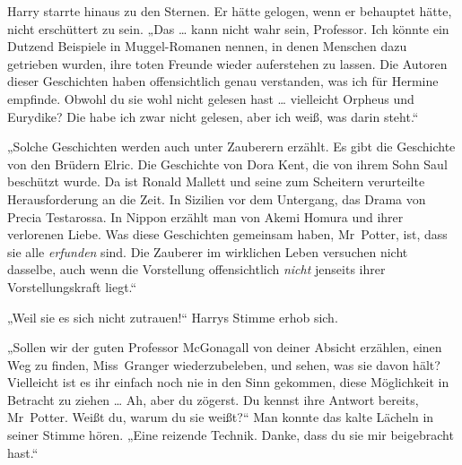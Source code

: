 Harry starrte hinaus zu den Sternen. Er hätte gelogen, wenn er behauptet hätte, nicht erschüttert zu sein.
„Das … kann nicht wahr sein, Professor. Ich könnte ein Dutzend Beispiele in Muggel-Romanen nennen, in denen Menschen dazu getrieben wurden, ihre toten Freunde wieder auferstehen zu lassen. Die Autoren dieser Geschichten haben offensichtlich genau verstanden, was ich für Hermine empfinde. Obwohl du sie wohl nicht gelesen hast … vielleicht Orpheus und Eurydike? Die habe ich zwar nicht gelesen, aber ich weiß, was darin steht.“

„Solche Geschichten werden auch unter Zauberern erzählt. Es gibt die Geschichte von den Brüdern Elric. Die Geschichte von Dora Kent, die von ihrem Sohn Saul beschützt wurde. Da ist Ronald Mallett und seine zum Scheitern verurteilte Herausforderung an die Zeit. In Sizilien vor dem Untergang, das Drama von Precia Testarossa. In Nippon erzählt man von Akemi Homura und ihrer verlorenen Liebe. Was diese Geschichten gemeinsam haben, Mr~Potter, ist, dass sie alle \emph{erfunden} sind. Die Zauberer im wirklichen Leben versuchen nicht dasselbe, auch wenn die Vorstellung offensichtlich \emph{nicht} jenseits ihrer Vorstellungskraft liegt.“

„Weil sie es sich nicht zutrauen!“ Harrys Stimme erhob sich.

„Sollen wir der guten Professor McGonagall von deiner Absicht erzählen, einen Weg zu finden, Miss~Granger wiederzubeleben, und sehen, was sie davon hält? Vielleicht ist es ihr einfach noch nie in den Sinn gekommen, diese Möglichkeit in Betracht zu ziehen … Ah, aber du zögerst. Du kennst ihre Antwort bereits, Mr~Potter. Weißt du, warum du sie weißt?“ Man konnte das kalte Lächeln in seiner Stimme hören.
„Eine reizende Technik. Danke, dass du sie mir beigebracht hast.“

